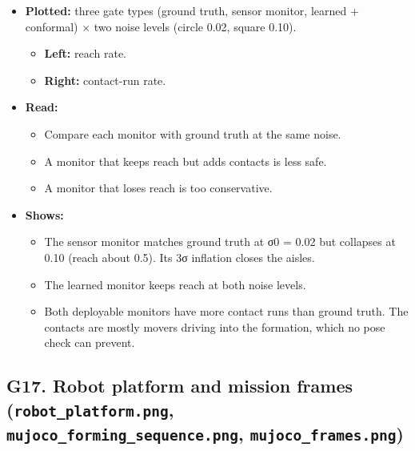 \documentclass[
  10.5pt,
  a4paper,
]{article}
\providecommand{\tightlist}{%
  \setlength{\itemsep}{0pt}\setlength{\parskip}{0pt}}
\begin{document}
\begin{itemize}
\tightlist
\item
  \textbf{Plotted:} three gate types (ground truth, sensor monitor,
  learned + conformal) × two noise levels (circle 0.02, square 0.10).

  \begin{itemize}
  \tightlist
  \item
    \textbf{Left:} reach rate.
  \item
    \textbf{Right:} contact-run rate.
  \end{itemize}
\item
  \textbf{Read:}

  \begin{itemize}
  \tightlist
  \item
    Compare each monitor with ground truth at the same noise.
  \item
    A monitor that keeps reach but adds contacts is less safe.
  \item
    A monitor that loses reach is too conservative.
  \end{itemize}
\item
  \textbf{Shows:}

  \begin{itemize}
  \tightlist
  \item
    The sensor monitor matches ground truth at σ0 = 0.02 but collapses
    at 0.10 (reach about 0.5). Its 3σ inflation closes the aisles.
  \item
    The learned monitor keeps reach at both noise levels.
  \item
    Both deployable monitors have more contact runs than ground truth.
    The contacts are mostly movers driving into the formation, which no
    pose check can prevent.
  \end{itemize}
\end{itemize}

\hypertarget{g17.-robot-platform-and-mission-frames-robot_platform.png-mujoco_forming_sequence.png-mujoco_frames.png}{%
\subsection{\texorpdfstring{G17. Robot platform and mission frames
(\texttt{robot\_platform.png}, \texttt{mujoco\_forming\_sequence.png},
\texttt{mujoco\_frames.png})}{G17. Robot platform and mission frames (robot\_platform.png, mujoco\_forming\_sequence.png, mujoco\_frames.png)}}\label{g17.-robot-platform-and-mission-frames-robot_platform.png-mujoco_forming_sequence.png-mujoco_frames.png}}
\end{document}
